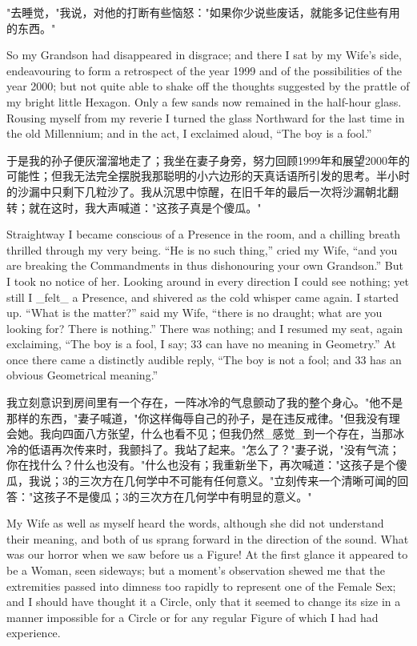 \documentclass[12pt,UTF8]{ctexbook}
\begin{document}
"去睡觉，"我说，对他的打断有些恼怒："如果你少说些废话，就能多记住些有用的东西。"

So my Grandson had disappeared in disgrace; and there I sat by my Wife's side, endeavouring to form a retrospect of the year 1999 and of the possibilities of the year 2000; but not quite able to shake off the thoughts suggested by the prattle of my bright little Hexagon. Only a few sands now remained in the half-hour glass. Rousing myself from my reverie I turned the glass Northward for the last time in the old Millennium; and in the act, I exclaimed aloud, ``The boy is a fool.''

于是我的孙子便灰溜溜地走了；我坐在妻子身旁，努力回顾1999年和展望2000年的可能性；但我无法完全摆脱我那聪明的小六边形的天真话语所引发的思考。半小时的沙漏中只剩下几粒沙了。我从沉思中惊醒，在旧千年的最后一次将沙漏朝北翻转；就在这时，我大声喊道："这孩子真是个傻瓜。"

Straightway I became conscious of a Presence in the room, and a chilling breath thrilled through my very being. ``He is no such thing,'' cried my Wife, ``and you are breaking the Commandments in thus dishonouring your own Grandson.'' But I took no notice of her. Looking around in every direction I could see nothing; yet still I \_felt\_ a Presence, and shivered as the cold whisper came again. I started up. ``What is the matter?'' said my Wife, ``there is no draught; what are you looking for? There is nothing.'' There was nothing; and I resumed my seat, again exclaiming, ``The boy is a fool, I say; 33 can have no meaning in Geometry.'' At once there came a distinctly audible reply, ``The boy is not a fool; and 33 has an obvious Geometrical meaning.''

我立刻意识到房间里有一个存在，一阵冰冷的气息颤动了我的整个身心。"他不是那样的东西，"妻子喊道，"你这样侮辱自己的孙子，是在违反戒律。"但我没有理会她。我向四面八方张望，什么也看不见；但我仍然\_感觉\_到一个存在，当那冰冷的低语再次传来时，我颤抖了。我站了起来。"怎么了？"妻子说，"没有气流；你在找什么？什么也没有。"什么也没有；我重新坐下，再次喊道："这孩子是个傻瓜，我说；3的三次方在几何学中不可能有任何意义。"立刻传来一个清晰可闻的回答："这孩子不是傻瓜；3的三次方在几何学中有明显的意义。"

My Wife as well as myself heard the words, although she did not understand their meaning, and both of us sprang forward in the direction of the sound. What was our horror when we saw before us a Figure! At the first glance it appeared to be a Woman, seen sideways; but a moment's observation shewed me that the extremities passed into dimness too rapidly to represent one of the Female Sex; and I should have thought it a Circle, only that it seemed to change its size in a manner impossible for a Circle or for any regular Figure of which I had had experience.
\end{document}
